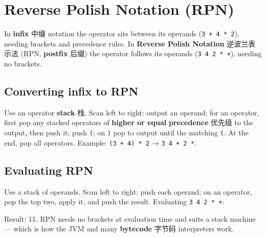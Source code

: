 \documentclass[11pt]{article}
\begin{document}
\section*{Reverse Polish Notation (RPN)}

In \textbf{infix} 中缀 notation the operator sits between its operands (\texttt{3 + 4 * 2}), needing brackets and precedence rules. In \textbf{Reverse Polish Notation} 逆波兰表示法 (RPN, \textbf{postfix} 后缀) the operator follows its operands (\texttt{3 4 2 * +}), needing no brackets.

\subsection*{Converting infix to RPN}

Use an operator \textbf{stack} 栈. Scan left to right: output an operand; for an operator, first pop any stacked operators of \textbf{higher or equal} \textbf{precedence} 优先级 to the output, then push it; push \texttt{(}; on \texttt{)} pop to output until the matching \texttt{(}. At the end, pop all operators. Example: \texttt{(3 + 4) * 2} → \texttt{3 4 + 2 *}.

\subsection*{Evaluating RPN}

Use a stack of operands. Scan left to right: push each operand; on an operator, pop the top two, apply it, and push the result. Evaluating \texttt{3 4 2 * +}:

\begin{center}
\end{center}

Result: 11. RPN needs no brackets at evaluation time and suits a stack machine — which is how the JVM and many \textbf{bytecode} 字节码 interpreters work.
\end{document}
